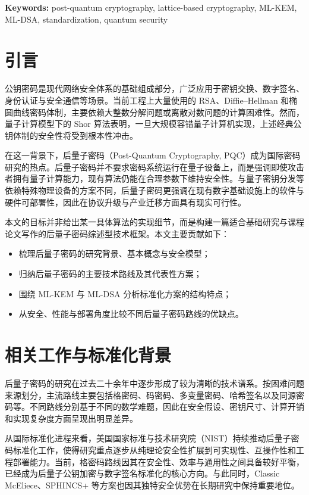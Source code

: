 ﻿\documentclass[12pt,a4paper]{ctexart}
\numberwithin{equation}{section}
\newcommand{\engkeywords}[1]{\par\noindent\textbf{Keywords:} #1}
\begin{document}
\engkeywords{post-quantum cryptography, lattice-based cryptography, ML-KEM, ML-DSA, standardization, quantum security}

\tableofcontents
\newpage

\section{引言}
公钥密码是现代网络安全体系的基础组成部分，广泛应用于密钥交换、数字签名、身份认证与安全通信等场景。当前工程上大量使用的 RSA、Diffie--Hellman 和椭圆曲线密码体制，主要依赖大整数分解问题或离散对数问题的计算困难性。然而，量子计算模型下的 Shor 算法表明，一旦大规模容错量子计算机实现，上述经典公钥体制的安全性将受到根本性冲击。

在这一背景下，后量子密码（Post-Quantum Cryptography, PQC）成为国际密码研究的热点。后量子密码并不要求密码系统运行在量子设备上，而是强调即使攻击者拥有量子计算能力，现有算法仍能在合理参数下维持安全性。与量子密钥分发等依赖特殊物理设备的方案不同，后量子密码更强调在现有数字基础设施上的软件与硬件可部署性，因此在协议升级与产业迁移方面具有现实可行性。

本文的目标并非给出某一具体算法的实现细节，而是构建一篇适合基础研究与课程论文写作的后量子密码综述型技术框架。本文主要贡献如下：
\begin{itemize}[leftmargin=2em]
    \item 梳理后量子密码的研究背景、基本概念与安全模型；
    \item 归纳后量子密码的主要技术路线及其代表性方案；
    \item 围绕 ML-KEM 与 ML-DSA 分析标准化方案的结构特点；
    \item 从安全、性能与部署角度比较不同后量子密码路线的优缺点。
\end{itemize}

\section{相关工作与标准化背景}
后量子密码的研究在过去二十余年中逐步形成了较为清晰的技术谱系。按困难问题来源划分，主流路线主要包括格密码、码密码、多变量密码、哈希签名以及同源密码等。不同路线分别基于不同的数学难题，因此在安全假设、密钥尺寸、计算开销和实现复杂度方面呈现出明显差异。

从国际标准化进程来看，美国国家标准与技术研究院（NIST）持续推动后量子密码标准化工作，使得研究重点逐步从纯理论安全性扩展到可实现性、互操作性和工程部署能力。当前，格密码路线因其在安全性、效率与通用性之间具备较好平衡，已经成为后量子公钥加密与数字签名标准化的核心方向。与此同时，Classic McEliece、SPHINCS+ 等方案也因其独特安全优势在长期研究中保持重要地位。
\end{document}
